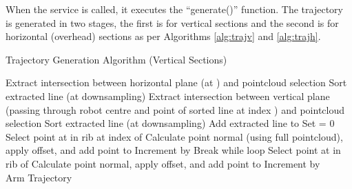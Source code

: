 When the service is called, it executes the ``generate()'' function. The trajectory is generated in two stages, the first is for vertical sections and the second is for horizontal (overhead) sections as per Algorithms \ref{alg:trajv} and \ref{alg:trajh}.
\begin{algorithm}[H]
\caption{Trajectory Generation Algorithm (Vertical Sections)}
\label{alg:trajv}
\begin{algorithmic}[1]
\begin{raggedright}
\State Extract intersection between horizontal plane (at ) and pointcloud selection
\State Sort extracted line (at  downsampling)
\State Extract intersection between vertical plane (passing through robot centre and point of sorted line at index ) and pointcloud selection
\State Sort extracted line (at  downsampling)
\State Add extracted line to 
\EndFor
\State Set  = 0
\State Select point at  in rib at index  of 
\State Calculate point normal (using full pointcloud), apply offset, and add point to 
\EndFor
\State Increment  by 
\State Break while loop
\EndIf
{}
\State Select point at  in rib  of 
\State Calculate point normal, apply offset, and add point to 
\EndFor
\State Increment  by 
\EndWhile
\EndFunction\\
\Return Arm Trajectory
\end{raggedright}
\end{algorithmic}
\end{algorithm}
